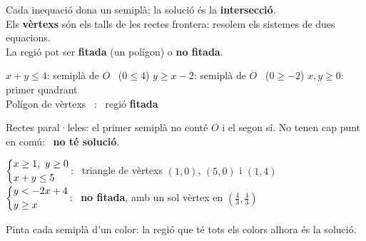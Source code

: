 \documentclass[11pt,a4paper]{article}
\makeatletter
\newcommand{\eixos}[4]{\draw[fmmuted!22,line width=0.4pt] (#1,#3) grid (#2,#4);
  \draw[-{Latex[length=2mm]},fmmuted,line width=0.8pt] (#1-0.2,0)--(#2+0.4,0) node[right,font=\small]{$x$};
  \draw[-{Latex[length=2mm]},fmmuted,line width=0.8pt] (0,#3-0.2)--(0,#4+0.4) node[above,font=\small]{$y$};}
\newcommand{\sis}[2]{\left\{\begin{array}{@{}l@{}}#1\\[2pt]#2\end{array}\right.}
\makeatother
\begin{document}
\vfill
\begin{minipage}[c]{0.5\linewidth}
\begin{idea}
Cada inequació dona un semiplà; la solució és la \textbf{intersecció}.\\[3pt]
Els \textbf{vèrtexs} són els talls de les rectes frontera: resolem els sistemes de dues equacions.\\[3pt]
La regió pot ser \textbf{fitada} (un polígon) o \textbf{no fitada}.
\end{idea}
\end{minipage}\hfill
\begin{minipage}[c]{0.47\linewidth}\centering
{}
\end{minipage}

\vfill
\begin{exemple}[Exemple: \ $x+y\le4$, \ $y\ge x-2$, \ $x\ge0$, \ $y\ge0$]
$x+y\le4$: semiplà de $O$ \ ($0\le4$) \qquad $y\ge x-2$: semiplà de $O$ \ ($0\ge-2$) \qquad $x,y\ge0$: primer quadrant\\[3pt]
Polígon de vèrtexs \ : \ regió \textbf{fitada}
\end{exemple}

\vfill
\begin{exemple}[Exemple: \ $x+y\ge4$ \ i \ $x+y\le1$]
Rectes paral·leles: el primer semiplà no conté $O$ i el segon sí. No tenen cap punt en comú: \ \textbf{no té solució}.
\end{exemple}

\vfill
\begin{exemple}[Exemples]
$\sis{x\ge1,\ y\ge0}{x+y\le5}$: \ triangle de vèrtexs $(1,0)$, $(5,0)$ i $(1,4)$\\[5pt]
$\sis{y<-2x+4}{y\ge x}$: \ \textbf{no fitada}, amb un sol vèrtex en $\left(\frac43,\frac43\right)$
\end{exemple}

\vfill
\begin{truc}
Pinta cada semiplà d'un color: la regió que té tots els colors alhora és la solució.
\end{truc}
\end{document}
